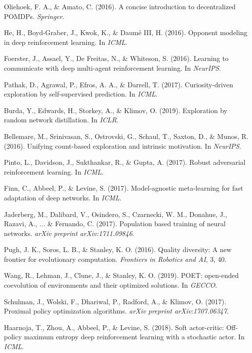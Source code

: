 \documentclass[12pt, a4paper]{article}
\begin{document}
\begin{thebibliography}{99}
Oliehoek, F. A., \& Amato, C. (2016). A concise introduction to decentralized POMDPs. \textit{Springer}.

He, H., Boyd-Graber, J., Kwok, K., \& Daumé III, H. (2016). Opponent modeling in deep reinforcement learning. In \textit{ICML}.

Foerster, J., Assael, Y., De Freitas, N., \& Whiteson, S. (2016). Learning to communicate with deep multi-agent reinforcement learning. In \textit{NeurIPS}.

Pathak, D., Agrawal, P., Efros, A. A., \& Darrell, T. (2017). Curiosity-driven exploration by self-supervised prediction. In \textit{ICML}.

Burda, Y., Edwards, H., Storkey, A., \& Klimov, O. (2019). Exploration by random network distillation. In \textit{ICLR}.

Bellemare, M., Srinivasan, S., Ostrovski, G., Schaul, T., Saxton, D., \& Munos, R. (2016). Unifying count-based exploration and intrinsic motivation. In \textit{NeurIPS}.

Pinto, L., Davidson, J., Sukthankar, R., \& Gupta, A. (2017). Robust adversarial reinforcement learning. In \textit{ICML}.

Finn, C., Abbeel, P., \& Levine, S. (2017). Model-agnostic meta-learning for fast adaptation of deep networks. In \textit{ICML}.

Jaderberg, M., Dalibard, V., Osindero, S., Czarnecki, W. M., Donahue, J., Razavi, A., ... \& Fernando, C. (2017). Population based training of neural networks. \textit{arXiv preprint arXiv:1711.09846}.

Pugh, J. K., Soros, L. B., \& Stanley, K. O. (2016). Quality diversity: A new frontier for evolutionary computation. \textit{Frontiers in Robotics and AI}, 3, 40.

Wang, R., Lehman, J., Clune, J., \& Stanley, K. O. (2019). POET: open-ended coevolution of environments and their optimized solutions. In \textit{GECCO}.

Schulman, J., Wolski, F., Dhariwal, P., Radford, A., \& Klimov, O. (2017). Proximal policy optimization algorithms. \textit{arXiv preprint arXiv:1707.06347}.

Haarnoja, T., Zhou, A., Abbeel, P., \& Levine, S. (2018). Soft actor-critic: Off-policy maximum entropy deep reinforcement learning with a stochastic actor. In \textit{ICML}.


\end{thebibliography}
\end{document}
